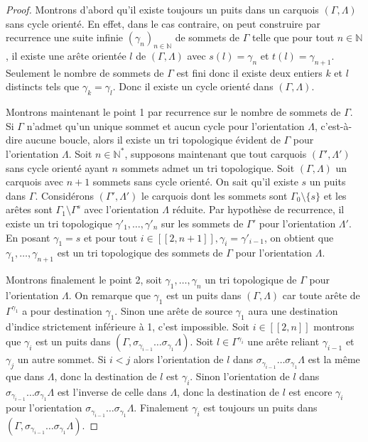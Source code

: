 \documentclass[a4paper,11pt]{article}
\begin{document}
\begin{proof}
  Montrons d'abord qu'il existe toujours un puits dans un carquois $(\Gamma,\Lambda)$ sans cycle orienté. En effet, dans le cas contraire, on peut construire par recurrence une suite infinie $(\gamma_{n})_{n\in \mathbb N}$ de sommets de $\Gamma$ telle que pour tout $n \in \mathbb N$, il existe une arête orientée $l$ de $(\Gamma,\Lambda)$ avec $s(l) = \gamma_{n}$ et $t(l) = \gamma_{n+1}$. Seulement le nombre de sommets de $\Gamma$ est fini donc il existe deux entiers $k$ et $l$ distincts tels que $\gamma_{k} = \gamma_{l}$. Donc il existe un cycle orienté dans $(\Gamma, \Lambda)$.

Montrons maintenant le point 1 par recurrence sur le nombre de sommets de $\Gamma$. Si $\Gamma$ n'admet qu'un unique sommet et aucun cycle pour l'orientation $\Lambda$, c'est-à-dire aucune boucle, alors il existe un tri topologique évident de $\Gamma$ pour l'orientation $\Lambda$. Soit $n \in \mathbb N^{*}$, supposons maintenant que tout carquois $(\Gamma',\Lambda')$ sans cycle orienté ayant $n$ sommets admet un tri topologique. Soit $(\Gamma,\Lambda)$ un carquois avec $n+1$ sommets sans cycle orienté. On sait qu'il existe $s$ un puits dans $\Gamma$. Considérons $(\Gamma',\Lambda')$ le carquois dont les sommets sont $\Gamma_{0} \setminus \{s\}$ et les arêtes sont $\Gamma_{1} \setminus \Gamma^{s}$ avec l'orientation $\Lambda$ réduite. Par hypothèse de recurrence, il existe un tri topologique $\gamma'_{1}, \dots, \gamma'_{n}$ sur les sommets de $\Gamma'$ pour l'orientation $\Lambda'$. En posant $\gamma_{1} = s$ et pour tout $i \in [\![2,n+1]\!], \gamma_{i} = \gamma'_{i-1}$, on obtient que $\gamma_{1}, \dots, \gamma_{n+1}$ est un tri topologique des sommets de $\Gamma$ pour l'orientation $\Lambda$. 

Montrons finalement le point 2, soit $\gamma_{1}, \dots, \gamma_{n}$ un tri topologique de $\Gamma$ pour l'orientation $\Lambda$. On remarque que $\gamma_{1}$ est un puits dans $(\Gamma,\Lambda)$ car toute arête de $\Gamma^{\gamma_{1}}$ a pour destination $\gamma_{1}$. Sinon une arête de source $\gamma_{1}$ aura une destination d'indice strictement inférieure à 1, c'est impossible. Soit $i \in [\![2,n]\!]$ montrons que $\gamma_{i}$ est un puits dans $(\Gamma,\sigma_{\gamma_{i-1}} \dots \sigma_{\gamma_{1}} \Lambda)$. Soit $l \in \Gamma^{\gamma_{i}}$ une arête reliant $\gamma_{i-1}$ et $\gamma_{j}$ un autre sommet. Si $i<j$ alors l'orientation de $l$ dans $\sigma_{\gamma_{i-1}} \dots \sigma_{\gamma_{1}} \Lambda$ est la même que dans $\Lambda$, donc la destination de $l$ est $\gamma_{i}$. Sinon l'orientation de $l$ dans $\sigma_{\gamma_{i-1}} \dots \sigma_{\gamma_{1}} \Lambda$ est l'inverse de celle dans $\Lambda$, donc la destination de $l$ est encore $\gamma_{i}$ pour l'orientation $\sigma_{\gamma_{i-1}} \dots \sigma_{\gamma_{1}} \Lambda$. Finalement $\gamma_{i}$ est toujours un puits dans $(\Gamma,\sigma_{\gamma_{i-1}} \dots \sigma_{\gamma_{1}} \Lambda)$.
\end{proof}
\end{document}
